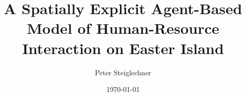 \documentclass{kththesis}
\title{A Spatially Explicit Agent-Based Model of Human-Resource Interaction on Easter Island}
\author{Peter Steiglechner}
\date{\today}
\begin{document}
\frontmatter
%
\titlepage

\begin{abstract}
	
\end{abstract}
\begin{otherlanguage}{swedish}
	\begin{abstract}
	
	\end{abstract}
\end{otherlanguage}

\tableofcontents

\mainmatter
%












\printbibliography[heading=bibintoc]

\appendix


\tailmatter
\end{document}
